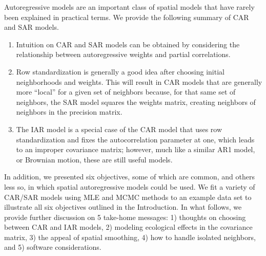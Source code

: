 \documentclass[11pt, titlepage]{article}\usepackage[]{graphicx}\usepackage[]{color}
\begin{document}
\begin{spacing}{1.9}
\begin{flushleft}
Autoregressive models are an important class of spatial models that have rarely been explained in practical terms. We provide the following summary of CAR and SAR models.
\begin{enumerate}
 \item Intuition on CAR and SAR models can be obtained by considering the relationship between
autoregressive weights and partial correlations.
 \item Row standardization is generally a good idea after choosing initial neighborhoods and weights. This will result in CAR models that are generally more “local” for a given set of neighbors because, for that same set of neighbors, the SAR model squares the weights matrix, creating neighbors of neighbors in the precision matrix.
 \item The IAR model is a special case of the CAR model that uses row standardization and fixes the autocorrelation parameter at one, which leads to an improper covariance matrix; however, much like a similar AR1 model, or Brownian motion, these are still useful models.
\end{enumerate}

In addition, we presented six objectives, some of which are common, and others less so, in which spatial autoregressive models could be used. We fit a variety of CAR/SAR models using MLE and MCMC methods to an example data set to illustrate all six objectives outlined in the Introduction. In what follows, we provide further discussion on 5 take-home messages: 1) thoughts on choosing between CAR and IAR models, 2) modeling ecological effects in the covariance matrix, 3) the appeal of spatial smoothing, 4) how to handle isolated neighbors, and 5) software considerations.


\end{flushleft}
\end{spacing}
\end{document}
